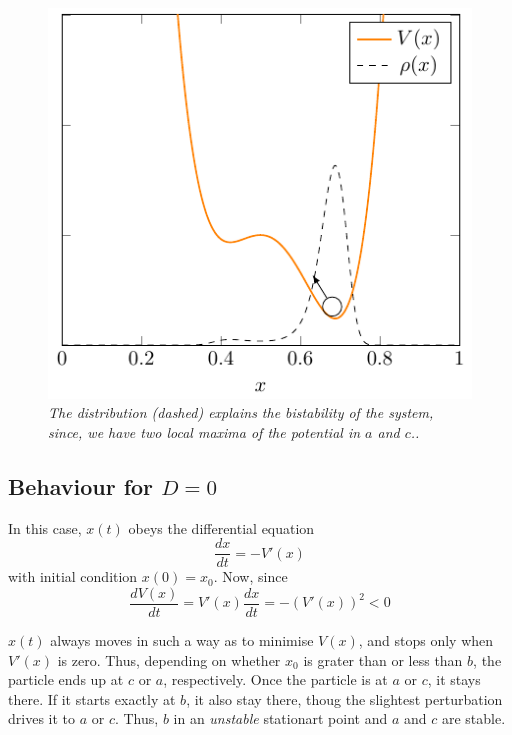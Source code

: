 \begin{figure}[h]
\centering
\includegraphics[scale=1.2]{images/kramerpot.pdf}
\caption{\emph{The distribution (dashed) explains the bistability of the system, since, we have two local maxima of the potential in $a$ and $c$..}}
\label{fig:kramerpot}
\end{figure}

\subsection{Behaviour for $D=0$}
In this case, $x(t)$ obeys the differential equation
\begin{equation}
\frac{dx}{dt} = - V'(x)
\end{equation}
with initial condition $x(0) = x_0$.
Now, since
$$
\frac{dV(x)}{dt} = V'(x)\frac{dx}{dt} = - (V'(x))^2 < 0 
$$

$x(t)$ always moves in such a way as to minimise $V(x)$, and stops only when $V'(x)$ is zero. Thus, depending on whether $x_0$ is grater than or less than $b$, the particle ends up at $c$ or $a$, respectively. Once the particle is at $a$ or $c$, it stays there. If it starts exactly at $b$, it also stay there, thoug the slightest perturbation drives it to $a$ or $c$. Thus, $b$ in an \emph{unstable} stationart point and $a$ and $c$ are stable.
